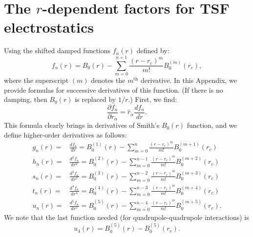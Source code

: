 \newpage
\section{The $r$-dependent factors for TSF electrostatics}
\label{radialTSF}

Using the shifted damped functions $f_n(r)$ defined by:
%
\begin{equation}
f_n(r)= B_0(r) -\sum_{m=0}^{n+1} \frac {(r-r_c)^m}{m!} B_0^{(m)}(r_c)  ,
\end{equation}
%
where the superscript $(m)$ denotes the $m^\mathrm{th}$ derivative. In
this Appendix, we provide formulas for successive derivatives of this
function.  (If there is no damping, then $B_0(r)$ is replaced by
$1/r$.)  First, we find:
%
\begin{equation}
\frac{\partial f_n}{\partial r_\alpha}=\hat{r}_\alpha \frac{d f_n}{d r} .
\end{equation}
%
This formula clearly brings in derivatives of Smith's $B_0(r)$
function, and we define higher-order derivatives as follows:
%
\begin{align}
g_n(r)=& \frac{d f_n}{d r} =
B_0^{(1)}(r) -\sum_{m=0}^{n} \frac {(r-r_c)^m}{m!} B_0^{(m+1)}(r_c) \\
h_n(r)=& \frac{d^2f_n}{d r^2} =
B_0^{(2)}(r) -\sum_{m=0}^{n-1} \frac {(r-r_c)^m}{m!} B_0^{(m+2)}(r_c) \\
s_n(r)=& \frac{d^3f_n}{d r^3} =
B_0^{(3)}(r) -\sum_{m=0}^{n-2} \frac {(r-r_c)^m}{m!} B_0^{(m+3)}(r_c) \\
t_n(r)=& \frac{d^4f_n}{d r^4} =
B_0^{(4)}(r) -\sum_{m=0}^{n-3} \frac {(r-r_c)^m}{m!} B_0^{(m+4)}(r_c) \\
u_n(r)=& \frac{d^5f_n}{d r^5} =
B_0^{(5)}(r) -\sum_{m=0}^{n-4} \frac {(r-r_c)^m}{m!} B_0^{(m+5)}(r_c)  .
\end{align}
%
We note that the last function needed (for quadrupole-quadrupole interactions) is
%
\begin{equation}
u_4(r)=B_0^{(5)}(r) - B_0^{(5)}(r_c) .
\end{equation}
